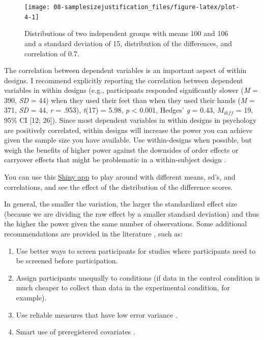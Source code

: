 \documentclass[
  oneside]{book}
\providecommand{\tightlist}{%
  \setlength{\itemsep}{0pt}\setlength{\parskip}{0pt}}
\begin{document}
\begin{figure}

{\centering \texttt{[image: 08-samplesizejustification\_files/figure-latex/plot-4-1]} 

}

\caption{Distributions of two independent groups with means 100 and 106 and a standard deviation of 15, distribution of the differences, and correlation of 0.7.}\label{fig:plot-4}
\end{figure}

The correlation between dependent variables is an important aspect of within designs. I recommend explicitly reporting the correlation between dependent variables in within designs (e.g., participants responded significantly slower (\emph{M} = 390, \emph{SD} = 44) when they used their feet than when they used their hands (\emph{M} = 371, \emph{SD} = 44, \emph{r} = .953), \emph{t}(17) = 5.98, \emph{p} \textless{} 0.001, Hedges' \emph{g} = 0.43, \(M_{diff}\) = 19, 95\% CI {[}12; 26{]}). Since most dependent variables in within designs in psychology are positively correlated, within designs will increase the power you can achieve given the sample size you have available. Use within-designs when possible, but weigh the benefits of higher power against the downsides of order effects or carryover effects that might be problematic in a within-subject design \citep{maxwell_designing_2017}.

You can use this \href{http://shiny.ieis.tue.nl/within_between/}{Shiny app} to play around with different means, sd's, and correlations, and see the effect of the distribution of the difference scores.

In general, the smaller the variation, the larger the standardized effect size (because we are dividing the raw effect by a smaller standard deviation) and thus the higher the power given the same number of observations. Some additional recommendations are provided in the literature \citep{allison_power_1997, bausell_power_2002, hallahan_statistical_1996}, such as:

\begin{enumerate}
\def\labelenumi{\arabic{enumi}.}
\tightlist
\item
  Use better ways to screen participants for studies where participants need to be screened before participation.
\item
  Assign participants unequally to conditions (if data in the control condition is much cheaper to collect than data in the experimental condition, for example).
\item
  Use reliable measures that have low error variance \citep{williams_impact_1995}.
\item
  Smart use of preregistered covariates \citep{meyvis_increasing_2018}.
\end{enumerate}
\end{document}

